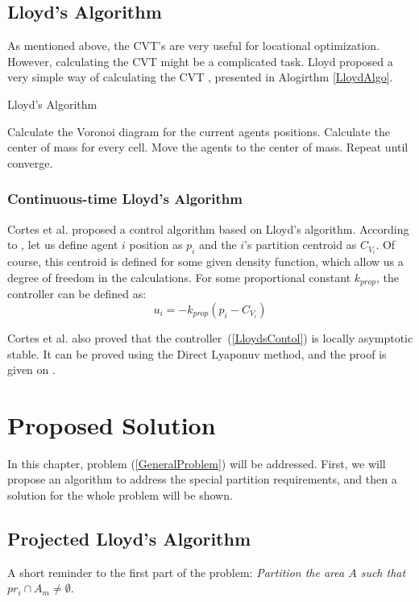 \documentclass{iacas}
\begin{document}
\subsection{Lloyd's Algorithm}
As mentioned above, the CVT's are very useful for locational optimization. However, calculating the CVT might be a complicated task. Lloyd proposed a very simple way of calculating the CVT \cite{Lloyd1982}, presented in Alogirthm \ref{LloydAlgo}. 
\begin{algorithm}
\caption{Lloyd's Algorithm}\label{LloydAlgo}
\begin{algorithmic}[1]
\State Calculate the Voronoi diagram for the current agents positions.
\State Calculate the center of mass for every cell.
\State Move the agents to the center of mass.
\State Repeat until converge.
\end{algorithmic}
\label{algo:lloyd's algorithm}
\end{algorithm}

\subsubsection*{Continuous-time Lloyd's Algorithm}
Cortes et al. proposed a control algorithm based on Lloyd's algorithm. According to \cite{Cortes2004}, let us define agent $i$ position as $p_i$ and the $i$'s partition centroid as $C_{V_{i}}$. Of course, this centroid is defined for some given density function, which allow us a degree of freedom in the calculations. For some proportional constant $k_{prop}$, the controller can be defined as:
\begin{equation} \label{LloydsContol}
u_{i} = -k_{prop}\left( p_i - C_{V_{i}} \right)
\end{equation} 

Cortes et al. also proved that the controller~(\ref{LloydsContol}) is locally asymptotic stable. It can be proved using the Direct Lyaponuv method, and the proof is given on \cite{Cortes2004}.


\section{Proposed Solution}

In this chapter, problem (\ref{GeneralProblem}) will be addressed. First, we will propose an algorithm to address the special partition requirements, and then a solution for the whole problem will be shown.

\subsection{Projected Lloyd's Algorithm}
A short reminder to the first part of the problem:
\emph{Partition the area $A$ such that $pr_i \cap A_m \neq \emptyset$}.
\end{document}
